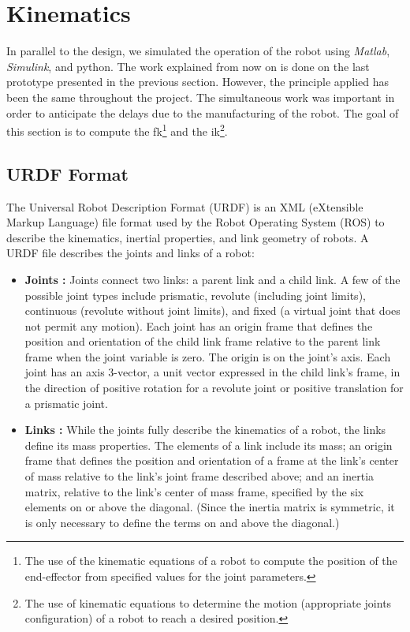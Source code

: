 \section{Kinematics}\insertloftspace
\setcounter{figure}{0}\setcounter{table}{0}

In parallel to the design, we simulated the operation of the robot using \textit{Matlab}, \textit{Simulink}\cite{Matlab}, and python. The work explained from now on is done on the last prototype presented in the previous section. However, the principle applied has been the same throughout the project. The simultaneous work was important in order to anticipate the delays due to the manufacturing of the robot. The goal of this section is to compute the \gls{fk}\footnote{The use of the kinematic equations of a robot to compute the position of the end-effector from specified values for the joint parameters.} and the \gls{ik}\footnote{The use of kinematic equations to determine the motion (appropriate joints configuration) of a robot to reach a desired position.}.

\subsection{URDF Format}

The Universal Robot Description Format (URDF) is an XML (eXtensible Markup Language) file format used by the Robot Operating System (ROS) to describe the kinematics, inertial properties, and link geometry of robots. A URDF file describes the joints and links of a robot:

\begin{itemize}
    \item \textbf{Joints :} Joints connect two links: a parent link and a child link. A few of the possible joint types include prismatic, revolute (including joint limits), continuous (revolute without joint limits), and fixed (a virtual joint that does not permit any motion). Each joint has an origin frame that defines the position and orientation of the child link frame relative to the parent link frame when the joint variable is zero. The origin is on the joint's axis. Each joint has an axis 3-vector, a unit vector expressed in the child link's frame, in the direction of positive rotation for a revolute joint or positive translation for a prismatic joint.
    \item \textbf{Links :} While the joints fully describe the kinematics of a robot, the links define its mass properties. The elements of a link include its mass; an origin frame that defines the position and orientation of a frame at the link's center of mass relative to the link's joint frame described above; and an inertia matrix, relative to the link's center of mass frame, specified by the six elements on or above the diagonal. (Since the inertia matrix is symmetric, it is only necessary to define the terms on and above the diagonal.)
\end{itemize}

